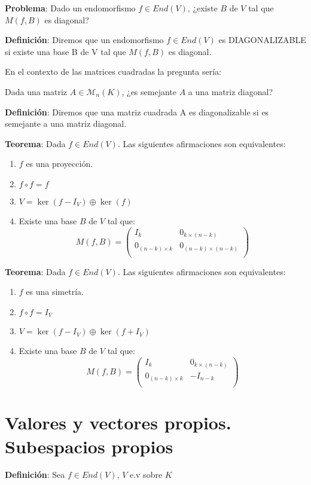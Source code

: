 \documentclass[x11names,table]{report}
\begin{document}
\textbf{Problema}: Dado un endomorfismo $f\in End(V)$, ¿existe $B$ de $V$ tal que $M(f,B)$ es diagonal?

\textbf{Definición}: Diremos que un endomorfismo $f\in End(V)$ es DIAGONALIZABLE si existe una base B de V tal que $M(f,B)$ es diagonal.

En el contexto de las matrices cuadradas la pregunta sería:

Dada una matriz $A\in \mathcal{M}_n(K)$, ¿es semejante $A$ a una matriz diagonal?

\textbf{Definición}: Diremos que una matriz cuadrada A es diagonalizable si es semejante a una matriz diagonal.


\textbf{Teorema}: Dada $f\in End(V)$. Las siguientes afirmaciones son equivalentes:
\begin{enumerate}
\item $f$ es una proyección.
\item $f\circ f=f$
\item $V=\ker(f-I_V)\oplus \ker(f)$
\item Existe una base $B$ de $V$ tal que:
\[M(f,B)=\left(
\begin{array}{c|c}
I_k & 0_{k\times(n-k)}\\ \hline
0_{(n-k)\times k} & 0_{(n-k)\times(n-k)}\\
\end{array}
\right)
\]
\end{enumerate}

\textbf{Teorema}: Dada $f\in End(V)$. Las siguientes afirmaciones son equivalentes:
\begin{enumerate}
\item $f$ es una simetría.
\item $f\circ f=I_V$
\item $V=\ker(f-I_V)\oplus \ker(f+I_V)$
\item Existe una base $B$ de $V$ tal que:
\[M(f,B)=\left(
\begin{array}{c|c}
I_k & 0_{k\times(n-k)}\\ \hline
0_{(n-k)\times k} & -I_{n-k}\\
\end{array}
\right)
\]
\end{enumerate}

\section{Valores y vectores propios. Subespacios propios}

\textbf{Definición}: Sea $f\in End(V)$, $V$ e.v sobre $K$
\end{document}
